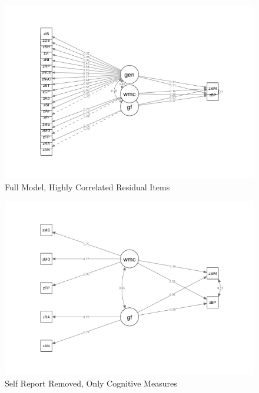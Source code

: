 \documentclass[]{book}
\begin{document}
\begin{figure}

{\centering \includegraphics[width=1\linewidth]{img/sem2} 

}

\caption{Full Model, Highly Correlated Residual Items}\label{fig:model2}
\end{figure}

\begin{figure}

{\centering \includegraphics[width=1\linewidth]{img/sem3} 

}

\caption{Self Report Removed, Only Cognitive Measures}\label{fig:model3}
\end{figure}
\end{document}
